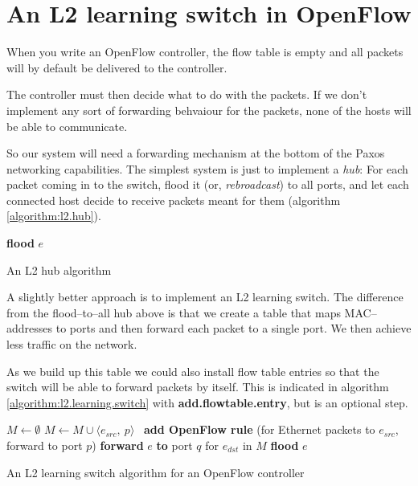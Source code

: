 \section{An L2 learning switch in OpenFlow}
\label{chapter:l2.learning.switch}

When you write an OpenFlow controller, the flow table is empty and all
packets will by default be delivered to the controller.

The controller must then decide what to do with the packets.  If we don't
implement any sort of forwarding behvaiour for the packets, none of the
hosts will be able to communicate.

So our system will need a forwarding mechanism at the bottom of the Paxos
networking capabilities.  The simplest system is just to implement a
\textit{hub}:  For each packet coming in to the switch, flood it (or,
\textit{rebroadcast}) to all ports, and let each connected host decide 
to receive packets meant for them (algorithm \ref{algorithm:l2.hub}).

\begin{algorithm}
  \begin{algorithmic}
      \State \textbf{flood} $e$ 
    \EndOn
  \end{algorithmic}
  \caption{An L2 hub algorithm}
  \label{algorithm:l2.hub}
\end{algorithm}

A slightly better approach is to implement an \ac{L2} learning switch.
The difference from the flood--to--all hub above is that we create a table
that maps MAC--addresses to ports and then forward each packet to a single
port.  We then achieve less traffic on the network.

As we build up this table we could also install flow table entries so that the
switch will be able to forward packets by itself.  This is indicated in
algorithm \vref{algorithm:l2.learning.switch} with
\textbf{add.flowtable.entry}, but is an optional step.

\begin{algorithm}
  \begin{algorithmic}
    \State $M \gets \emptyset$
    \State
      \State $M \gets M \cup \langle e_{src},\ p \rangle$ 
      \State
      \State \textbf{add OpenFlow rule }(for Ethernet packets to
        $e_{src}$, forward to port $p$)
      \State
        \State \textbf{forward} $e$ \textbf{to} port $q$ for $e_{dst}$ in $M$
      \Else
        \State \textbf{flood} $e$ 
      \EndIf
    \EndOn
  \end{algorithmic}
  \caption{An L2 learning switch algorithm for an OpenFlow controller}
  \label{algorithm:l2.learning.switch}
\end{algorithm}

